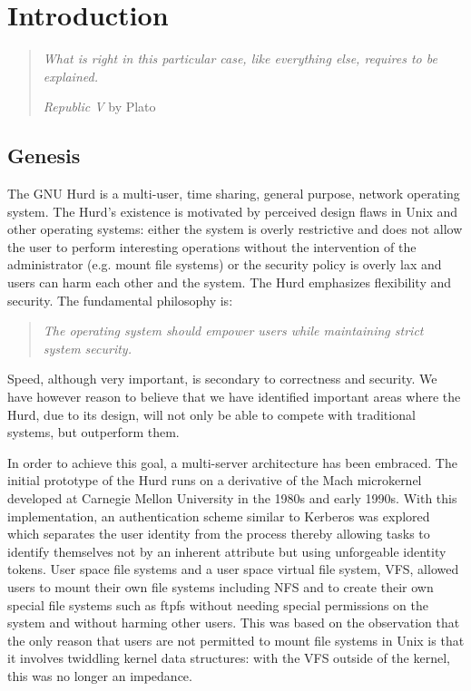 \chapter{Introduction}

\begin{quote}
\emph{What is right in this particular case, like everything else,
requires to be explained.}

\begin{flushright}
\emph{Republic V} by Plato
\end{flushright}
\end{quote}

\section{Genesis}

The GNU Hurd is a multi-user, time sharing, general purpose, network
operating system.  The Hurd's existence is motivated by perceived
design flaws in Unix and other operating systems: either the system is
overly restrictive and does not allow the user to perform interesting
operations without the intervention of the administrator (e.g. mount
file systems) or the security policy is overly lax and users can harm
each other and the system.  The Hurd emphasizes flexibility and
security.  The fundamental philosophy is:

\begin{quote}
  \emph{The operating system should empower users while maintaining
  strict system security.}
\end{quote}

\noindent
Speed, although very important, is secondary to correctness and
security.  We have however reason to believe that we have identified
important areas where the Hurd, due to its design, will not only be
able to compete with traditional systems, but outperform them.

In order to achieve this goal, a multi-server architecture has been
embraced.  The initial prototype of the Hurd runs on a derivative of
the Mach microkernel developed at Carnegie Mellon University in the
1980s and early 1990s.  With this implementation, an authentication
scheme similar to Kerberos was explored which separates the user
identity from the process thereby allowing tasks to identify
themselves not by an inherent attribute but using unforgeable identity
tokens.  User space file systems and a user space virtual file system,
VFS, allowed users to mount their own file systems including NFS and
to create their own special file systems such as ftpfs without needing
special permissions on the system and without harming other users.
This was based on the observation that the only reason that users are
not permitted to mount file systems in Unix is that it involves
twiddling kernel data structures: with the VFS outside of the kernel,
this was no longer an impedance.

